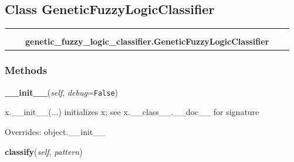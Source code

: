 \subsection{Class GeneticFuzzyLogicClassifier}

    \label{genetic_fuzzy_logic_classifier:GeneticFuzzyLogicClassifier}
\begin{tabular}{cccccc}
\multicolumn{2}{r}{\settowidth{\BCL}{object}\multirow{2}{\BCL}{object}}
&&
  \\\cline{3-3}
  &&\multicolumn{1}{c|}{}
&&
  \\
&&\multicolumn{2}{l}{\textbf{genetic\_fuzzy\_logic\_classifier.GeneticFuzzyLogicClassifier}}
\end{tabular}



  \subsubsection{Methods}

    \vspace{0.5ex}

\hspace{.8\funcindent}\begin{boxedminipage}{\funcwidth}

    \raggedright \textbf{\_\_init\_\_}(\textit{self}, \textit{debug}={\tt False})

\setlength{\parskip}{2ex}
    x.\_\_init\_\_(...) initializes x; see x.\_\_class\_\_.\_\_doc\_\_ for 
    signature

\setlength{\parskip}{1ex}
      Overrides: object.\_\_init\_\_

    \end{boxedminipage}

    \label{genetic_fuzzy_logic_classifier:GeneticFuzzyLogicClassifier:classify}

    \vspace{0.5ex}

\hspace{.8\funcindent}\begin{boxedminipage}{\funcwidth}

    \raggedright \textbf{classify}(\textit{self}, \textit{pattern})

\setlength{\parskip}{2ex}
\setlength{\parskip}{1ex}
    \end{boxedminipage}

